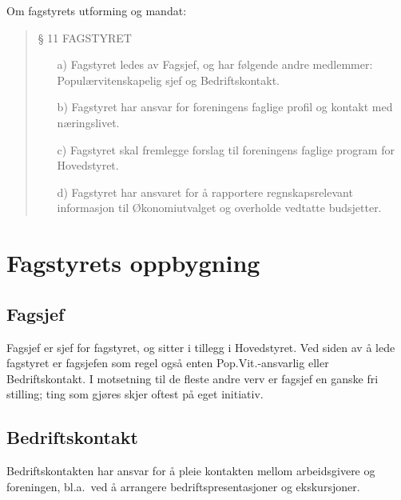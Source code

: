 %
Om fagstyrets utforming og mandat:
\begin{quote}

    {\Large § 11 FAGSTYRET}
    
    \begin{itemize}
        \item[a)] Fagstyret ledes av Fagsjef, og har følgende andre medlemmer:
        Populærvitenskapelig sjef og Bedriftskontakt.
        
        \item[b)] Fagstyret har ansvar for foreningens faglige profil og
        kontakt med næringslivet.
        
        \item[c)] Fagstyret skal fremlegge forslag til foreningens faglige
        program for Hovedstyret.
        
        \item[d)] Fagstyret har ansvaret for å rapportere regnskapsrelevant
        informasjon til Økonomiutvalget og overholde vedtatte budsjetter.
    \end{itemize}

\end{quote}

\section{Fagstyrets oppbygning}
\subsection{Fagsjef}
Fagsjef er sjef for fagstyret, og sitter i tillegg i Hovedstyret.
Ved siden av å lede fagstyret er
fagsjefen som regel også enten Pop.Vit.-ansvarlig eller Bedriftskontakt.
I motsetning til de fleste andre verv er fagsjef en ganske fri stilling; ting
som gjøres skjer oftest på eget initiativ.

\subsection{Bedriftskontakt}
Bedriftskontakten har ansvar for å pleie kontakten mellom arbeidsgivere og
foreningen, bl.a.~ved å arrangere bedriftspresentasjoner og ekskursjoner.

